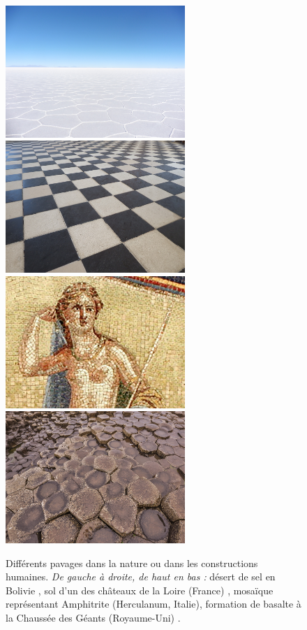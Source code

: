 \begin{figure}[ht]
  \begin{center}
    \includegraphics[width=6.8cm]{images/Notions/pavage_mer_de_sel}
    \includegraphics[width=6.8cm]{images/Notions/pavage_chateau}\\
    \includegraphics[width=6.8cm]{images/Notions/pavage_mosaique}
    \includegraphics[width=6.8cm]{images/Notions/pavage_chaussee_des_geants}\\
    \caption[Différents pavages dans la nature ou dans les constructions humaines]
    {Différents pavages dans la nature ou dans les constructions humaines.
    \emph{De gauche à droite, de haut en bas :} désert de sel en Bolivie
    \cite{pavage1}, sol d'un des châteaux de la Loire (France) \cite{pavage2},
    mosaïque représentant Amphitrite (Herculanum, Italie), formation de basalte à la Chaussée des
    Géants (Royaume-Uni) \cite{pavage4}.\label{fig:pavage-exemple}}
  \end{center}
\end{figure}

